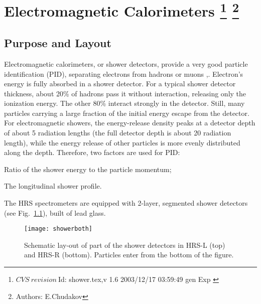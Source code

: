 \chapter[Electromagnetic Calorimeters]{Electromagnetic Calorimeters
\footnote{
  $CVS~revision~ $Id: shower.tex,v 1.6 2003/12/17 03:59:49 gen Exp $ $
}
\footnote{Authors: E.Chudakov }
}

\section{Purpose and Layout}

Electromagnetic calorimeters, or shower detectors, provide a very good
particle identification (PID), separating electrons from hadrons or
muons \cite{Bartoszek:1991ex},\cite{Appel:1975tt}.  Electron's energy
is fully absorbed in a shower detector.  For a typical shower detector
thickness, about 20\% of hadrons pass it without interaction,
releasing only the ionization energy.  The other 80\% interact
strongly in the detector. Still, many particles carrying a large
fraction of the initial energy escape from the detector. For
electromagnetic showers, the energy-release density peaks at a
detector depth of about 5 radiation lengths (the full detector depth
is about 20 radiation length), while the energy release of other
particles is more evenly distributed along the depth.  Therefore, two
factors are used for PID:
\begin{list}{.~}{\setlength{\itemsep}{-0.15cm}}
  \item Ratio of the shower energy to the particle momentum;
  \item The longitudinal shower profile.
\end{list}

The HRS spectrometers are equipped with 2-layer, segmented shower
detectors (see Fig.~\ref{fig:hrs-det-shower_layout}), built of
lead glass.
\begin{figure}[htb]
\begin{center}
   \texttt{[image: showerboth]}
\end{center}
\caption[Schematic lay-out of part of the shower detectors in HRS]%
{Schematic lay-out of part of the shower detectors in HRS-L
(top) and HRS-R (bottom). Particles enter from the bottom of the figure.}
\label{fig:hrs-det-shower_layout}
\end{figure}
  
